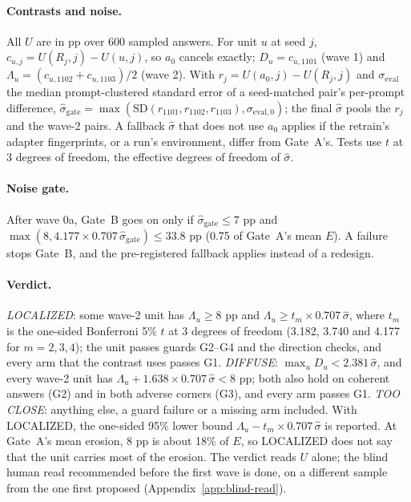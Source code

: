 \documentclass{article}
\theoremstyle{plain}
\theoremstyle{definition}
\theoremstyle{remark}
\begin{document}
\paragraph{Contrasts and noise.}
All $U$ are in pp over 600 sampled answers. For unit $u$ at seed $j$,
$c_{u,j} = U(R_j, j) - U(u, j)$, so $a_0$ cancels exactly; $D_u =
c_{u,1101}$ (wave 1) and $\Lambda_u = (c_{u,1102} + c_{u,1103})/2$ (wave 2).
With $r_j = U(a_0, j) - U(R_j, j)$ and $\sigma_{\mathrm{eval}}$ the median
prompt-clustered standard error of a seed-matched pair's per-prompt
difference, $\hat\sigma_{\mathrm{gate}} = \max(\mathrm{SD}(r_{1101}, r_{1102},
r_{1103}), \sigma_{\mathrm{eval},0})$; the final $\hat\sigma$ pools the $r_j$
and the wave-2 pairs. A fallback $\hat\sigma$ that does not use $a_0$ applies
if the retrain's adapter fingerprints, or a run's environment, differ from
Gate~A's. Tests use $t$ at 3 degrees of freedom, the effective degrees of
freedom of $\hat\sigma$.

\paragraph{Noise gate.}
After wave 0a, Gate~B goes on only if $\hat\sigma_{\mathrm{gate}} \le 7$ pp and
$\max(8, 4.177 \times 0.707\,\hat\sigma_{\mathrm{gate}}) \le 33.8$ pp (0.75 of
Gate~A's mean $E$). A failure stops Gate~B, and the pre-registered fallback
applies instead of a redesign.

\paragraph{Verdict.}
\emph{LOCALIZED}: some wave-2 unit has $\Lambda_u \ge 8$ pp and
$\Lambda_u \ge t_m \times 0.707\,\hat\sigma$, where $t_m$ is the one-sided
Bonferroni 5\% $t$ at 3 degrees of freedom (3.182, 3.740 and 4.177 for
$m = 2, 3, 4$); the unit passes guards G2--G4 and the direction checks, and
every arm that the contrast uses passes G1. \emph{DIFFUSE}:
$\max_u D_u < 2.381\,\hat\sigma$, and every wave-2 unit has
$\Lambda_u + 1.638 \times 0.707\,\hat\sigma < 8$ pp; both also hold on coherent
answers (G2) and in both adverse corners (G3), and every arm passes G1.
\emph{TOO CLOSE}: anything else, a guard failure or a missing arm included.
With LOCALIZED, the one-sided 95\% lower bound
$\Lambda_u - t_m \times 0.707\,\hat\sigma$ is reported. At Gate~A's mean
erosion, 8 pp is about 18\% of $E$, so LOCALIZED does not say that the unit
carries most of the erosion. The verdict reads $U$ alone; the blind human read
recommended before the first wave is done, on a different sample from the one
first proposed (Appendix~\ref{app:blind-read}).
\end{document}
